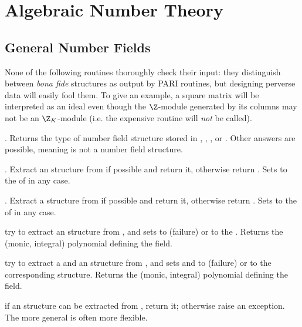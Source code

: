 %
%
\newpage
\chapter{Algebraic Number Theory}

\section{General Number Fields}


None of the following routines thoroughly check their input: they
distinguish between \emph{bona fide} structures as output by PARI routines,
but designing perverse data will easily fool them. To give an example, a
square matrix will be interpreted as an ideal even though the $\Z$-module
generated by its columns may not be an $\Z_K$-module (i.e. the expensive
 routine will \emph{not} be called).

. Returns the type of number field structure stored in
, , , or . Other answers
are possible, meaning  is not a number field structure.

. Extract an  structure from
 if possible and return it, otherwise return . Sets
 to the  of  in any case.

. Extract a  structure from
 if possible and return it, otherwise return . Sets
 to the  of  in any case.

 try to extract an  structure
from , and sets  to  (failure) or to the .
Returns the (monic, integral) polynomial defining the field.

 try to extract a 
and an  structure from , and sets 
and  to  (failure) or to the corresponding structure.
Returns the (monic, integral) polynomial defining the field.

 if an  structure can be extracted from
, return it; otherwise raise an exception. The more general
 is often more flexible.

